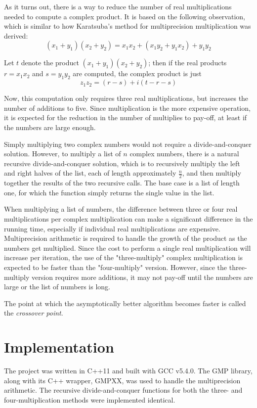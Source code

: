 \documentclass[usletter, 12pt]{article}
\begin{document}
        As it turns out, there is a way to reduce the number of real multiplications needed to compute a complex product. It is based on the following observation, which is similar to how Karatsuba's method for multiprecision multiplication was derived:
            \[ (x_{1}+y_{1})(x_{2}+y_{2})=x_{1}x_{2}+(x_{1}y_{2}+y_{1}x_{2})+y_{1}y_{2} \]

        Let $t$ denote the product $(x_{1}+y_{1})(x_{2}+y_{2})$; then if the real products $r=x_{1}x_{2}$ and $s=y_{1}y_{2}$ are computed, the complex product is just
            \[ z_{1}z_{2}=(r-s)+i(t-r-s) \]

        Now, this computation only requires three real multiplications, but increases the number of additions to five. Since multiplication is the more expensive operation, it is expected for the reduction in the number of multiplies to pay-off, at least if the numbers are large enough.

        Simply multiplying two complex numbers would not require a divide-and-conquer solution. However, to multiply a list of $n$ complex numbers, there is a natural recursive divide-and-conquer solution, which is to recursively multiply the left and right halves of the list, each of length approximately $\frac{n}{2}$, and then multiply together the results of the two recursive calls. The base case is a list of length one, for which the function simply returns the single value in the list.

        When multiplying a list of numbers, the difference between three or four real multiplications per complex multiplication can make a significant difference in the running time, especially if individual real multiplications are expensive. Multiprecision arithmetic is required to handle the growth of the product as the numbers get multiplied. Since the cost to perform a single real multiplication will increase per iteration, the use of the "three-multiply" complex multiplication is expected to be faster than the "four-multiply" version. However, since the three-multiply version requires more additions, it may not pay-off until the numbers are large or the list of numbers is long.

        The point at which the asymptotically better algorithm becomes faster is called the \textit{crossover point}.

    \section{Implementation}
    The project was written in C++11 and built with GCC v5.4.0. The GMP library, along with its C++ wrapper, GMPXX, was used to handle the multiprecision arithmetic. The recursive divide-and-conquer functions for both the three- and four-multiplication methods were implemented identical.
\end{document}
